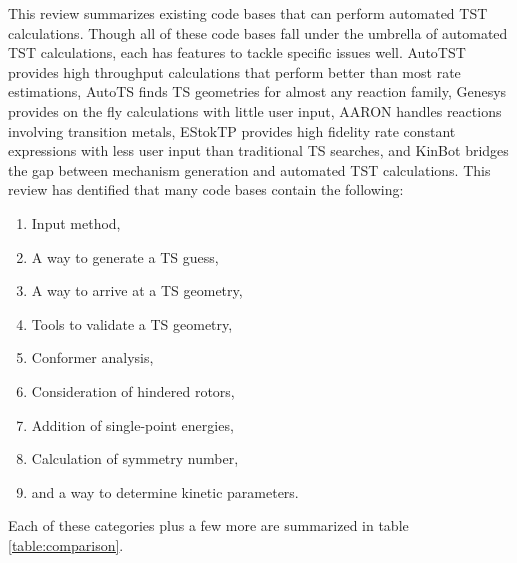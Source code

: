 \documentclass[preprint, 11pt]{elsarticle} %
\begin{document}
This review summarizes existing code bases that can perform automated TST calculations.
Though all of these code bases fall under the umbrella of automated TST calculations, each has features to tackle specific issues well.
AutoTST provides high throughput calculations that perform better than most rate estimations, AutoTS finds TS geometries for almost any reaction family, Genesys provides on the fly calculations with little user input, AARON handles reactions involving transition metals, EStokTP provides high fidelity rate constant expressions with less user input than traditional TS searches, and KinBot bridges the gap between mechanism generation and automated TST calculations. 
This review has dentified that many code bases contain the following:
\begin{enumerate}
    \item Input method,
    \item A way to generate a TS guess,
    \item A way to arrive at a TS geometry,
    \item Tools to validate a TS geometry,
    \item Conformer analysis,
    \item Consideration of hindered rotors,
    \item Addition of single-point energies,
    \item Calculation of symmetry number,
    \item and a way to determine kinetic parameters.
\end{enumerate}

Each of these categories plus a few more are summarized in table \ref{table:comparison}. 
\end{document}
